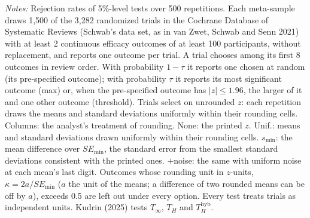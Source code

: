 \begin{table}[htbp]
\begin{minipage}{\linewidth}\footnotesize\textit{Notes:} Rejection rates of 5\%-level tests over 500 repetitions. Each meta-sample draws 1{,}500 of the 3{,}282 randomized trials in the Cochrane Database of Systematic Reviews (Schwab's data set, as in van Zwet, Schwab and Senn 2021) with at least 2 continuous efficacy outcomes of at least 100 participants, without replacement, and reports one outcome per trial. A trial chooses among its first 8 outcomes in review order. With probability $1 - \tau$ it reports one chosen at random (its pre-specified outcome); with probability $\tau$ it reports its most significant outcome (max) or, when the pre-specified outcome has $|z| \le 1.96$, the larger of it and one other outcome (threshold). Trials select on unrounded $z$: each repetition draws the means and standard deviations uniformly within their rounding cells. Columns: the analyst's treatment of rounding. None: the printed $z$. Unif.: means and standard deviations drawn uniformly within their rounding cells. $s_{\min}$: the mean difference over $SE_{\min}$, the standard error from the smallest standard deviations consistent with the printed ones. $+$noise: the same with uniform noise at each mean's last digit. Outcomes whose rounding unit in $z$-units, $\kappa = 2a/SE_{\min}$ ($a$ the unit of the means; a difference of two rounded means can be off by $a$), exceeds 0.5 are left out under every option. Every test treats trials as independent units. Kudrin (2025) tests $T_\infty$, $T_H$ and $T_H^{\mathrm{hyb}}$.\end{minipage}
\end{table}
